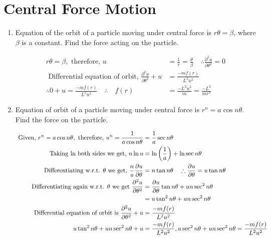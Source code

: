 \section{Central Force Motion}
\begin{enumerate}
	\item  Equation of the orbit of a particle moving under central force is $r \theta=\beta$, where $\beta$ is a constant. Find the force acting on the particle.
	\begin{answer}
		\begin{align*}
		r \theta=\beta,\text{ therefore, }u&=\frac{1}{r}=\frac{\theta}{\beta} \quad \therefore \frac{\partial^{2} u}{\partial \theta^{2}}=0\\
		\text{	Differential equation of orbit, }\frac{\partial^{2} u}{\partial \theta^{2}}+u&=\frac{-m f(r)}{L^{2} u^{2}}\\
		\therefore 0+u=\frac{-m f(r)}{L^{2} u^{2}} \quad \therefore \quad f(r)&=\frac{-L^{2} u^{3}}{m}=\frac{-L^{2}}{m r^{3}}
		\end{align*}
	\end{answer}
	\item  Equation of orbit of a particle moving under central force is $r^{n}=a \cos n \theta .$ Find the force on the particle.
	\begin{answer}
		\begin{align}
		\text{	Given, }r^{n}=a \cos n \theta,\text{ therefore, }u^{n}=\frac{1}{a \cos n \theta}&=\frac{1}{a} \sec n \theta \label{25}\\
		\text{ Taking $\ln$ both sides we get, }n \ln u&=\ln \left(\frac{1}{a}\right)+\ln \sec n \theta\notag\\
		\text{Differentiating w.r.t. $\theta$ we get, }\frac{n}{u} \frac{\partial u}{\partial \theta}&=n \tan n \theta \quad \therefore \frac{\partial u}{\partial \theta}=u \tan n \theta\notag\\
		\text{Differentiating again w.r.t. $\theta$ we get }\frac{\partial^{2} u}{\partial \theta^{2}}&=\frac{\partial u}{\partial \theta} \tan n \theta+u n \sec ^{2} n \theta\notag\\&=u \tan ^{2} n \theta+u n \sec ^{2} n \theta\notag\\
		\text{ Differential equation of orbit is }\frac{\partial^{2} u}{\partial \theta^{2}}+u&=\frac{-m f(r)}{L^{2} u^{2}}\notag\\
		u \tan ^{2} n \theta+u n \sec ^{2} n \theta+u&=\frac{-m f(r)}{L^{2} u^{2}}, u \sec ^{2} n \theta+u n \sec ^{2} n \theta=\frac{-m f(r)}{L^{2} u^{2}}\notag\\

\end{align}
\end{answer}
\end{enumerate}
